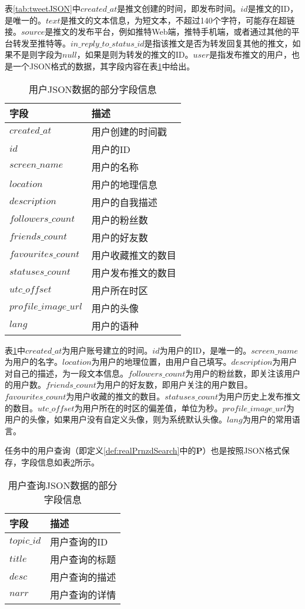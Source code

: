 表\ref{tab:tweetJSON}中$created\_at$是推文创建的时间，即发布时间。$id$是推文的ID，是唯一的。$text$是推文的文本信息，为短文本，不超过140个字符，可能存在超链接。$source$是推文的发布平台，例如推特Web端，推特手机端，或者通过其他的平台转发至推特等。$in\_reply\_to\_status\_id$是指该推文是否为转发回复其他的推文，如果不是则字段为$null$，如果是则为转发的推文的ID。$user$是指发布推文的用户，也是一个JSON格式的数据，其字段内容在表\ref{tab:userJSON}中给出。
\begin{table}[!htbp]
\centering
\caption{用户JSON数据的部分字段信息}
\begin{tabular}{|p{4cm}|p{7cm}|}
\hline
\textbf{字段} & \textbf{描述} \\
\hline
$created\_at$ & 用户创建的时间戳\\
\hline
$id$ & 用户的ID\\
\hline
$screen\_name$ & 用户的名称\\
\hline
$location$ & 用户的地理信息\\
\hline
$description$ & 用户的自我描述\\
\hline
$followers\_count$ & 用户的粉丝数\\
\hline
$friends\_count$ & 用户的好友数\\
\hline
$favourites\_count$ & 用户收藏推文的数目\\
\hline
$statuses\_count$ & 用户发布推文的数目\\
\hline
$utc\_offset$ & 用户所在时区\\
\hline
$profile\_image\_url$ & 用户的头像\\
\hline
$lang$ & 用户的语种\\
\hline
\end{tabular}
\label{tab:userJSON}
\end{table}

表\ref{tab:userJSON}中$created\_at$为用户账号建立的时间。$id$为用户的ID，是唯一的。$screen\_name$为用户的名字。$location$为用户的地理位置，由用户自己填写。$description$为用户对自己的描述，为一段文本信息。$followers\_count$为用户的粉丝数，即关注该用户的用户数。$friends\_count$为用户的好友数，即用户关注的用户数目。$favourites\_count$为用户收藏的推文的数目。$statuses\_count$为用户历史上发布推文的数目。$utc\_offset$为用户所在的时区的偏差值，单位为秒。$profile\_image\_url$为用户的头像，如果用户没有自定义头像，则为系统默认头像。$lang$为用户的常用语言。

任务中的用户查询（即定义\ref{def:realPrnzdSearch}中的$\mathbf{P}$）也是按照JSON格式保存，字段信息如表\ref{tab:queryJSON}所示。
\begin{table}[!htbp]
\centering
\caption{用户查询JSON数据的部分字段信息}
\begin{tabular}{|p{4cm}|p{7cm}|}
\hline
\textbf{字段} & \textbf{描述} \\
\hline
$topic\_id$ & 用户查询的ID\\
\hline
$title$ & 用户查询的标题\\
\hline
$desc$ & 用户查询的描述\\
\hline
$narr$ & 用户查询的详情\\
\hline
\end{tabular}
\label{tab:queryJSON}
\end{table}

